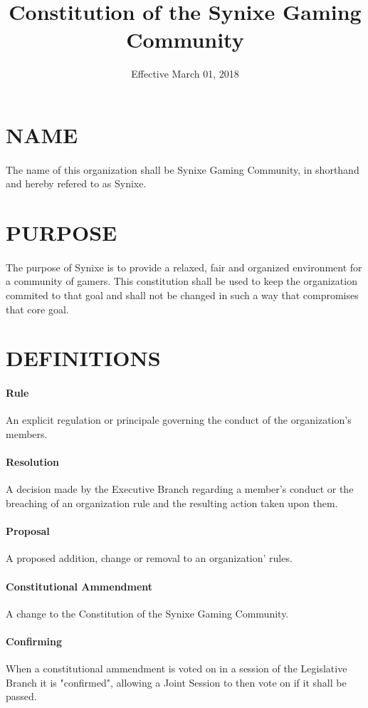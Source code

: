 \documentclass[10pt,a4paper]{article}
\title{Constitution of the Synixe Gaming Community}
\date{Effective March 01, 2018}
\begin{document}
\maketitle
\newpage
\section{NAME}
\paragraph{}
The name of this organization shall be Synixe Gaming Community, in shorthand and hereby refered to as Synixe.
\section{PURPOSE}
\paragraph{}
The purpose of Synixe is to provide a relaxed, fair and organized environment for a community of gamers. This constitution shall be used to keep the organization commited to that goal and shall not be changed in such a way that compromises that core goal.
\section{DEFINITIONS}
\paragraph{Rule} An explicit regulation or principale governing the conduct of the organization's members.
\paragraph{Resolution} A decision made by the Executive Branch regarding a member's conduct or the breaching of an organization rule and the resulting action taken upon them.
\paragraph{Proposal} A proposed addition, change or removal to an organization' rules.
\paragraph{Constitutional Ammendment} A change to the Constitution of the Synixe Gaming Community.
\paragraph{Confirming} When a constitutional ammendment is voted on in a session of the Legislative Branch it is "confirmed", allowing a Joint Session to then vote on if it shall be passed.
\end{document}
